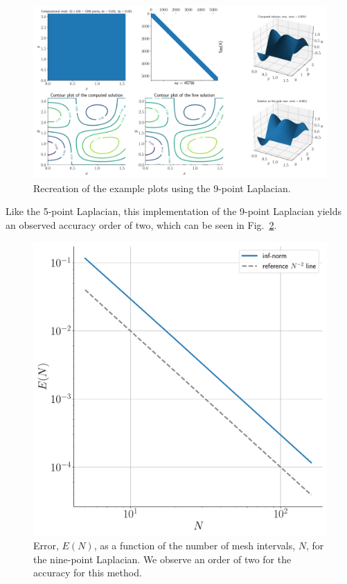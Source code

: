 \documentclass[12pt]{article}
\begin{document}
\begin{figure}[!h]
	\centering
	\includegraphics[clip,scale=0.4]{q2b_figure.pdf}
	\caption{Recreation of the example plots using the 9-point Laplacian.}
	\label{fig:nine_pt_soln_subplots}
\end{figure}

Like the 5-point Laplacian, this implementation of the 9-point Laplacian yields an observed accuracy order of two, which can be seen in Fig.~\ref{fig:nine_pt_err_scaling}.

\begin{figure}[!h]
	\centering
	\includegraphics[clip,scale=0.4]{q2b_err_fig.pdf}
	\caption{Error, $E(N)$, as a function of the number of mesh intervals, $N$, for the nine-point Laplacian. We observe an order of two for the accuracy for this method.}
	\label{fig:nine_pt_err_scaling}
\end{figure}
\end{document}
